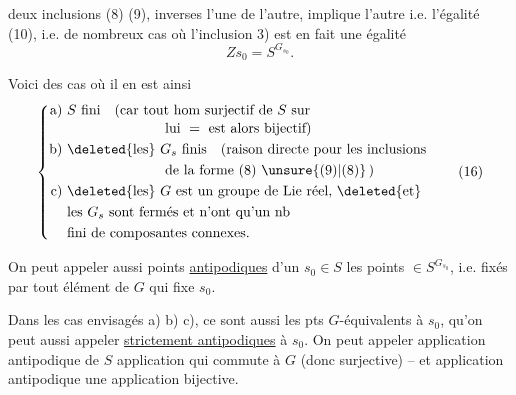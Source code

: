 deux inclusions (8) (9), inverses l'une de l'autre, implique l'autre i.e. l'égalité (10), i.e. de nombreux cas où l'inclusion 3) est en fait une égalité
\[
Zs_0=S^{G_{s_0}}.\tag*{(15)}
\]

Voici des cas où il en est ainsi
\[
\left\{\begin{aligned}
\text{a)}\ &S\text{ fini}\quad(\text{car tout hom surjectif de }S\text{ sur}\\[-2pt]
&\hspace{7em}\text{lui }=\text{ est alors bijectif})\\
\text{b)}\ &\deleted{\text{les}}\ G_s\text{ finis}\quad(\text{raison directe pour les inclusions}\\
&\hspace{7em}\text{de la forme (8) }\unsure{(9)|(8)}\,)\\
\text{c)}\ &\deleted{\text{les}}\ G\text{ est un groupe de Lie réel, }\deleted{\text{et}}\\
&\text{les }G_s\text{ sont fermés et n'ont qu'un nb}\\
&\text{fini de composantes connexes.}
\end{aligned}\right.\tag*{(16)}
\]

 On peut appeler aussi points \uline{antipodiques} d'un $s_0\in S$ les points   $\in S^{G_{s_0}}$, i.e. fixés par tout élément de $G$ qui  fixe $s_0$.

Dans les cas envisagés a) b) c), ce sont aussi les pts $G$-équivalents à $s_0$, qu'on peut aussi appeler \uline{strictement antipodiques} à $s_0$. On peut appeler application antipodique de $S$  application qui commute à $G$ (donc  surjective) --  et application antipodique une  application bijective.


